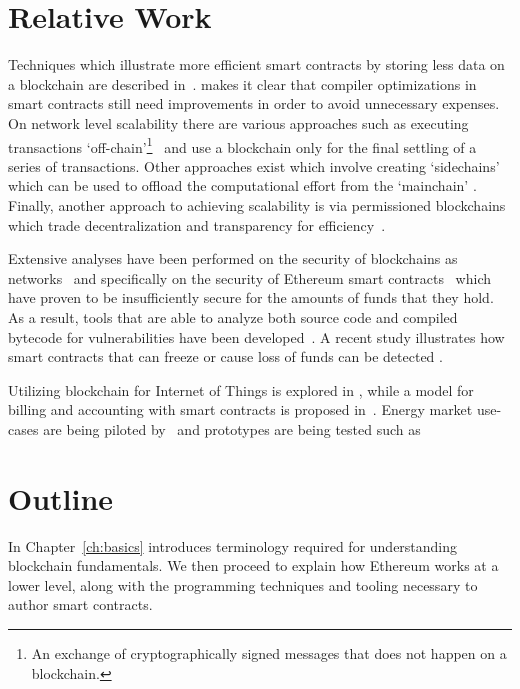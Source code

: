 \section{Relative Work}
Techniques which illustrate more efficient smart contracts by storing less data on a blockchain are described in~\cite{stateless}. \cite{DBLP:journals/corr/ChenLLZ17} makes it clear that compiler optimizations in smart contracts still need improvements in order to avoid unnecessary expenses. On network level scalability there are various approaches such as executing transactions `off-chain'\footnote{An exchange of cryptographically signed messages that does not happen on a blockchain.}~\cite{raiden, funfair, counterfactual} and use a blockchain only for the final settling of a series of transactions. Other approaches exist which involve creating `sidechains' which can be used to offload the computational effort from the `mainchain' \cite{sidechains, loom, cosmos, plasmacash, plasma}. Finally, another approach to achieving scalability is via permissioned blockchains which trade decentralization and transparency for efficiency~\cite{hyperledger, Vukolic:2017:RPB:3055518.3055526}.

Extensive analyses have been performed on the security of blockchains as networks~\cite{Gervais:2016:SPP:2976749.2978341, cryptoeprint:2018:236} and specifically on the security of Ethereum smart contracts~\cite{Atzei:2017:SAE:3080353.3080363} which have proven to be insufficiently secure for the amounts of funds that they hold. As a result, tools that are able to analyze both source code and compiled bytecode for vulnerabilities have been developed~\cite{Luu:2016:MSC:2976749.2978309, mythril, echidna, smartcheck, securify, zeus}. A recent study \cite{greedyprodigal} illustrates how smart contracts that can freeze or cause loss of funds can be detected \cite{maian}.

Utilizing blockchain for Internet of Things is explored in \cite{iot, integrationiot}, while a model for billing and accounting with smart contracts is proposed in~\cite{billaccount}. Energy market use-cases are being piloted by~\cite{gridplus, powerledger} and prototypes are being tested such as \cite{brooklyn, DBLP:journals/ife/MengelkampNBDW18}

\section{Outline}

In Chapter~\ref{ch:basics} introduces terminology required for understanding blockchain fundamentals. We then proceed to explain how Ethereum works at a lower level, along with the programming techniques and tooling necessary to author smart contracts.


